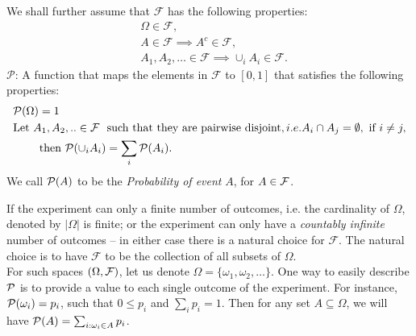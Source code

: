 We shall further assume that $\mathcal{F}$ has the following properties:
\begin{equation}
    \begin{aligned}
        & \Omega \in \mathcal{F}, \\
        & A \in \mathcal{F} \implies  A^c \in \mathcal{F},\\
        & A_1,A_2,\ldots  \in \mathcal{F} \implies \cup_{i} A_i \in \mathcal{F}.
    \end{aligned}\label{eq:sigma}
\end{equation}
$\mathcal{P}$: A function that maps the elements in $\mathcal{F}$ to $[0,1]$ that satisfies the following properties:
\begin{align}
    &\mathcal{P}(\Omega)=1 \label{eq:prob}\\
    &\mbox{Let}~ A_1,A_2,..  \in \mathcal{F} ~ \mbox{ such that they are pairwise disjoint}, i.e. A_i \cap A_j = \emptyset, ~ \mbox{if}~ i \neq j,  \nonumber \\
    & \qquad  ~ \mbox{then}~ \mathcal{P}(\cup_i A_i) = \sum_i \mathcal{P}(A_i). \nonumber
\end{align}
 We call $\mathcal{P}(A)$ to be the \textit{Probability of event} $A$, for $A \in \mathcal{F}$.


\begin{remark}\label{re:natural}
    If the experiment can only a finite number of outcomes, i.e. the cardinality of $\Omega$, denoted by $|\Omega|$ is finite; or the experiment can only have a \textit{countably infinite} number of outcomes -- in either case there is a natural choice for $\mathcal{F}$. The natural choice is to have $\mathcal{F}$ to be the collection of all subsets of $\Omega$. \\
    For such spaces $(\Omega,\mathcal{F})$, let us denote $\Omega = \{ \omega_1, \omega_2, \ldots\}$. One way to easily describe $\mathcal{P}$ is to provide a value to each single outcome of the experiment. For instance, $\mathcal{P}(\omega_i) = p_i$, such that $0 \leq p_i$ and $\sum_i p_i = 1$. Then for any set $A \subseteq  \Omega$, we will have $\mathcal{P}(A) = \sum_{i: \omega_i \in A} p_i$.
\end{remark}

